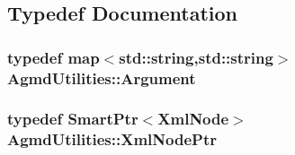 \subsection{Typedef Documentation}
\hypertarget{namespace_agmd_utilities_a93ce0bfe1d978003fb0319f5b3763e2c}{
\subsubsection[{Argument}]{\setlength{\rightskip}{0pt plus 5cm}typedef map$<$std\+::string,std\+::string$>$ {\bf Agmd\+Utilities\+::\+Argument}}}\label{namespace_agmd_utilities_a93ce0bfe1d978003fb0319f5b3763e2c}
\hypertarget{namespace_agmd_utilities_a5c62c53e06995bf0eddd56b55f44e62e}{
\subsubsection[{Xml\+Node\+Ptr}]{\setlength{\rightskip}{0pt plus 5cm}typedef {\bf Smart\+Ptr}$<${\bf Xml\+Node}$>$ {\bf Agmd\+Utilities\+::\+Xml\+Node\+Ptr}}}\label{namespace_agmd_utilities_a5c62c53e06995bf0eddd56b55f44e62e}


